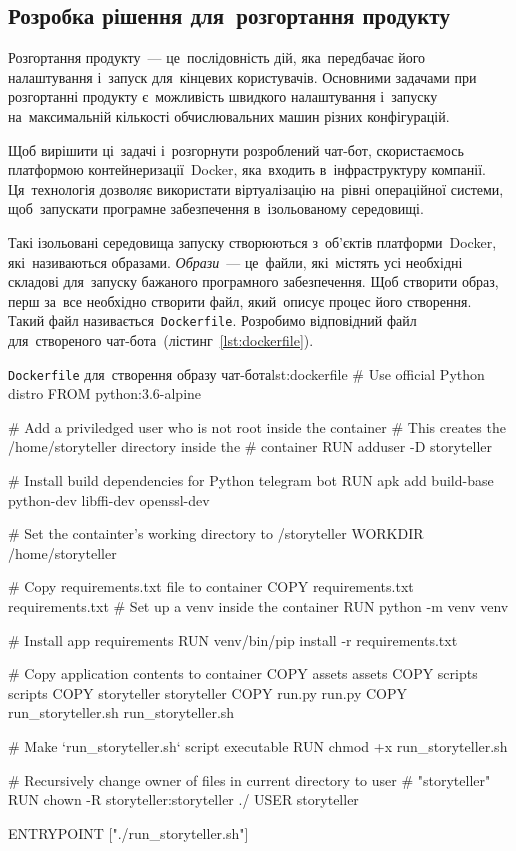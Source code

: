 \documentclass[
	a4paper,
	oneside,
	BCOR = 10mm,
	DIV = 12,
	12pt,
	headings = normal,
]{scrartcl}
\newcommand{\filename}[1]{\texttt{#1}}
\begin{document}
		\subsection{Розробка рішення для~розгортання продукту}
			Розгортання продукту~— це~послідовність дій, яка~передбачає його налаштування і~запуск для~кінцевих користувачів. Основними задачами при розгортанні продукту є~можливість швидкого налаштування і~запуску на~максимальній кількості обчислювальних машин різних конфігурацій.
			
			Щоб вирішити ці~задачі і~розгорнути розроблений чат-бот, скористаємось платформою контейнеризації~\textenglish{Docker}, яка~входить в~інфраструктуру компанії. Ця~технологія дозволяє використати віртуалізацію на~рівні операційної системи, щоб~запускати програмне забезпечення в~ізольованому середовищі.

			Такі ізольовані середовища запуску створюються з~об'єктів платформи~\textenglish{Docker}, які~називаються образами. \emph{Образи}~— це~файли, які~містять усі необхідні складові для~запуску бажаного програмного забезпечення. Щоб створити образ, перш за~все необхідно створити файл, який~описує процес його створення. Такий файл називається~\filename{\textenglish{Dockerfile}}. Розробимо відповідний файл для~створеного чат-бота~(лістинг~\ref{lst:dockerfile}).

			\begin{listingdocker}{\filename{\textenglish{Dockerfile}} для~створення образу чат-бота}{lst:dockerfile}
# Use official Python distro
FROM python:3.6-alpine

# Add a priviledged user who is not root inside the container
# This creates the /home/storyteller directory inside the
# container
RUN adduser -D storyteller

# Install build dependencies for Python telegram bot
RUN apk add build-base python-dev libffi-dev openssl-dev

# Set the containter's working directory to /storyteller
WORKDIR /home/storyteller

# Copy requirements.txt file to container
COPY requirements.txt requirements.txt
# Set up a venv inside the container
RUN python -m venv venv

# Install app requirements
RUN venv/bin/pip install -r requirements.txt

# Copy application contents to container
COPY assets assets
COPY scripts scripts
COPY storyteller storyteller
COPY run.py run.py
COPY run_storyteller.sh run_storyteller.sh

# Make `run_storyteller.sh` script executable
RUN chmod +x run_storyteller.sh

# Recursively change owner of files in current directory to user
# "storyteller"
RUN chown -R storyteller:storyteller ./
USER storyteller

ENTRYPOINT ["./run_storyteller.sh"]
			\end{listingdocker}
\end{document}
